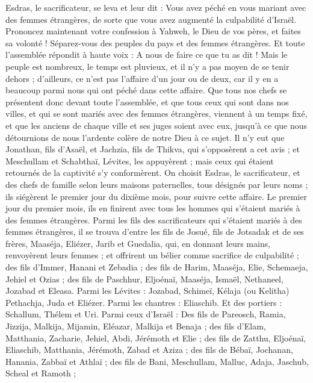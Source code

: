 \begin{multicols}{2}
Esdras, le sacrificateur, se leva et leur dit : Vous avez péché en vous mariant avec des femmes étrangères, de sorte que vous avez augmenté la culpabilité d'Israël.
Prononcez maintenant votre confession à Yahweh, le Dieu de vos pères, et faites sa volonté ! Séparez-vous des peuples du pays et des femmes étrangères.
Et toute l'assemblée répondit à haute voix : A nous de faire ce que tu as dit !
Mais le peuple est nombreux, le temps est pluvieux, et il n'y a pas moyen de se tenir dehors ; d’ailleurs, ce n’est pas l’affaire d’un jour ou de deux, car il y en a beaucoup parmi nous qui ont péché dans cette affaire.
Que tous nos chefs se présentent donc devant toute l'assemblée, et que tous ceux qui sont dans nos villes, et qui se sont mariés avec des femmes étrangères, viennent à un temps fixé, et que les anciens de chaque ville et ses juges soient avec eux, jusqu'à ce que nous détournions de nous l'ardente colère de notre Dieu à ce sujet.
Il n'y eut que Jonathan, fils d'Asaël, et Jachzia, fils de Thikva, qui s'opposèrent a cet avis ; et Meschullam et Schabthaï, Lévites, les appuyèrent ;
mais ceux qui étaient retournés de la captivité s’y conformèrent. On choisit Esdras, le sacrificateur, et des chefs de famille selon leurs maisons paternelles, tous désignés par leurs noms ; ils siégèrent le premier jour du dixième mois, pour suivre cette affaire.
Le premier jour du premier mois, ils en finirent avec tous les hommes qui s’étaient mariés à des femmes étrangères.
Parmi les fils des sacrificateurs qui s’étaient mariés à des femmes étrangères, il se trouva d'entre les fils de Josué, fils de Jotsadak et de ses frères, Maaséja, Eliézer, Jarib et Guedalia,
qui, en donnant leurs mains, renvoyèrent leurs femmes ; et offrirent un bélier comme sacrifice de culpabilité ;
des fils d'Immer, Hanani et Zebadia ;
des fils de Harim, Maaséja, Elie, Schemaeja, Jehiel et Ozias ;
des fils de Paschhur, Eljoénaï, Maaséja, Ismaël, Nethaneel, Jozabad et Eleasa.
Parmi les Lévites : Jozabad, Schimeï, Kélaja (ou Kelitha) Pethachja, Juda et Eliézer.
Parmi les chantres : Eliaschib. Et des portiers : Schallum, Thélem et Uri.
Parmi ceux d'Israël : Des fils de Pareosch, Ramia, Jizzija, Malkija, Mijamin, Eléazar, Malkija et Benaja ;
des fils d’Elam, Matthania, Zacharie, Jehiel, Abdi, Jérémoth et Elie ;
des fils de Zatthu, Eljoénaï, Eliaschib, Matthania, Jérémoth, Zabad et Aziza ;
des fils de Bébaï, Jochanan, Hanania, Zabbaï et Athlaï ;
des fils de Bani, Meschullam, Malluc, Adaja, Jaschub, Scheal et Ramoth ;

\end{multicols}
